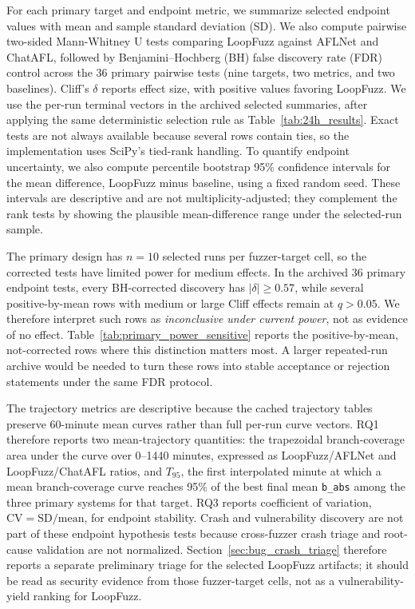 \documentclass[final,5p,times,number]{elsarticle}
\begin{document}
For each primary target and endpoint metric, we summarize selected endpoint values with mean and sample standard deviation (SD). We also compute pairwise two-sided Mann-Whitney U tests comparing LoopFuzz against AFLNet and ChatAFL, followed by Benjamini--Hochberg (BH) false discovery rate (FDR) control across the 36 primary pairwise tests (nine targets, two metrics, and two baselines). Cliff's $\delta$ reports effect size, with positive values favoring LoopFuzz. We use the per-run terminal vectors in the archived selected summaries, after applying the same deterministic selection rule as Table~\ref{tab:24h_results}. Exact tests are not always available because several rows contain ties, so the implementation uses SciPy's tied-rank handling. To quantify endpoint uncertainty, we also compute percentile bootstrap 95\% confidence intervals for the mean difference, LoopFuzz minus baseline, using a fixed random seed. These intervals are descriptive and are not multiplicity-adjusted; they complement the rank tests by showing the plausible mean-difference range under the selected-run sample.

The primary design has $n=10$ selected runs per fuzzer-target cell, so the corrected tests have limited power for medium effects. In the archived 36 primary endpoint tests, every BH-corrected discovery has $|\delta|\ge0.57$, while several positive-by-mean rows with medium or large Cliff effects remain at $q>0.05$. We therefore interpret such rows as \emph{inconclusive under current power}, not as evidence of no effect. Table~\ref{tab:primary_power_sensitive} reports the positive-by-mean, not-corrected rows where this distinction matters most. A larger repeated-run archive would be needed to turn these rows into stable acceptance or rejection statements under the same FDR protocol.

The trajectory metrics are descriptive because the cached trajectory tables preserve 60-minute mean curves rather than full per-run curve vectors. RQ1 therefore reports two mean-trajectory quantities: the trapezoidal branch-coverage area under the curve over 0--1440 minutes, expressed as LoopFuzz/AFLNet and LoopFuzz/ChatAFL ratios, and $T_{95}$, the first interpolated minute at which a mean branch-coverage curve reaches 95\% of the best final mean \texttt{b\_abs} among the three primary systems for that target. RQ3 reports coefficient of variation, $\mathrm{CV}=\mathrm{SD}/\mathrm{mean}$, for endpoint stability. Crash and vulnerability discovery are not part of these endpoint hypothesis tests because cross-fuzzer crash triage and root-cause validation are not normalized. Section~\ref{sec:bug_crash_triage} therefore reports a separate preliminary triage for the selected LoopFuzz artifacts; it should be read as security evidence from those fuzzer-target cells, not as a vulnerability-yield ranking for LoopFuzz.
\end{document}
